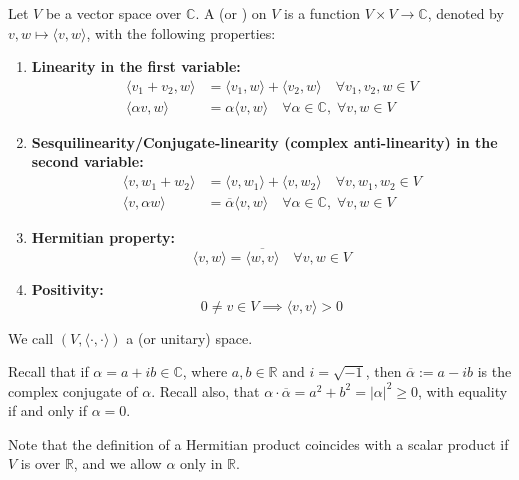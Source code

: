 \begin{definition}
\label{def:hermitian_product_complex}
Let $V$ be a vector space over $\mathbb{C}$. A  (or ) on $V$ is a function $V \times V \longrightarrow \mathbb{C}$, denoted by $v, w \mapsto \langle v, w \rangle$, with the following properties:
\begin{enumerate}
    \item \textbf{Linearity in the first variable:}
    \begin{align*}
        \langle v_1 + v_2, w \rangle &= \langle v_1, w \rangle + \langle v_2, w \rangle \quad \forall v_1, v_2, w \in V \\
        \langle \alpha v, w \rangle &= \alpha \langle v, w \rangle \quad \forall \alpha \in \mathbb{C}, \; \forall v, w \in V
    \end{align*}
    \item \textbf{Sesquilinearity/Conjugate-linearity (complex anti-linearity) in the second variable:}
    \begin{align*}
        \langle v, w_1 + w_2 \rangle &= \langle v, w_1 \rangle + \langle v, w_2 \rangle \quad \forall v, w_1, w_2 \in V \\
        \langle v, \alpha w \rangle &= \overline{\alpha} \langle v, w \rangle \quad \forall \alpha \in \mathbb{C}, \; \forall v, w \in V
    \end{align*}
    \item \textbf{Hermitian property:}
    \[
        \langle v, w \rangle = \overline{\langle w, v \rangle} \quad \forall v, w \in V
    \]
    \item \textbf{Positivity:}
    \[
        0 \neq v \in V \implies \langle v, v \rangle > 0
    \]
\end{enumerate}
We call $(V, \langle \cdot, \cdot \rangle)$ a  (or unitary) space.
\end{definition}

\begin{remark}
Recall that if $\alpha = a + ib \in \mathbb{C}$, where $a, b \in \mathbb{R}$ and $i = \sqrt{-1}$, then $\overline{\alpha} := a - ib$ is the complex conjugate of $\alpha$. Recall also, that $\alpha \cdot \overline{\alpha} = a^2 + b^2 = |\alpha|^2 \geq 0$, with equality if and only if $\alpha = 0$.

Note that the definition of a Hermitian product coincides with a scalar product if $V$ is over $\mathbb{R}$, and we allow $\alpha$ only in $\mathbb{R}$.
\end{remark}

